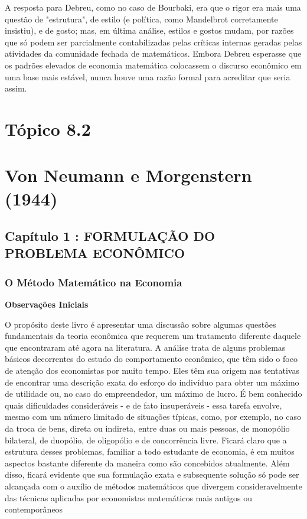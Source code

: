 \documentclass[12pt]{article}
\begin{document}
A resposta para Debreu, como no caso de Bourbaki, era que o rigor era mais uma questão de "estrutura", de estilo (e política, como Mandelbrot corretamente insistiu), e de gosto; mas, em última análise, estilos e gostos mudam, por razões que só podem ser parcialmente contabilizadas pelas críticas internas geradas pelas atividades da comunidade fechada de matemáticos. Embora Debreu esperasse que os padrões elevados de economia matemática colocassem o discurso econômico em uma base mais estável, nunca houve uma razão formal para acreditar que seria assim.

\newpage
\section*{\textbf{Tópico 8.2}}
\section{\textbf{Von Neumann e Morgenstern (1944)}}

\subsection{\textbf{Capítulo 1 : FORMULAÇÃO DO PROBLEMA ECONÔMICO}}

\subsubsection{\textbf{O Método Matemático na Economia}}

\textbf{Observações Iniciais}

O propósito deste livro é apresentar uma discussão sobre algumas questões fundamentais da teoria econômica que requerem um tratamento diferente daquele que encontraram até agora na literatura. A análise trata de alguns problemas básicos decorrentes do estudo do comportamento econômico, que têm sido o foco de atenção dos economistas por muito tempo. Eles têm sua origem nas tentativas de encontrar uma descrição exata do esforço do indivíduo para obter um máximo de utilidade ou, no caso do empreendedor, um máximo de lucro. É bem conhecido quais dificuldades consideráveis - e de fato insuperáveis - essa tarefa envolve, mesmo com um número limitado de situações típicas, como, por exemplo, no caso da troca de bens, direta ou indireta, entre duas ou mais pessoas, de monopólio bilateral, de duopólio, de oligopólio e de concorrência livre. Ficará claro que a estrutura desses problemas, familiar a todo estudante de economia, é em muitos aspectos bastante diferente da maneira como são concebidos atualmente. Além disso, ficará evidente que sua formulação exata e subsequente solução só pode ser alcançada com o auxílio de métodos matemáticos que divergem consideravelmente das técnicas aplicadas por economistas matemáticos mais antigos ou contemporâneos
\end{document}
